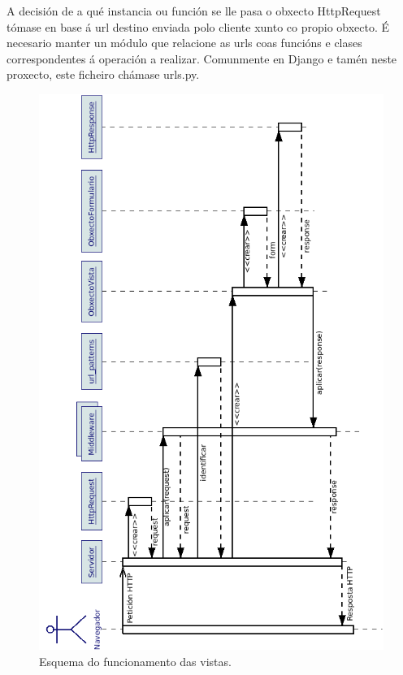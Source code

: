 A decisión de a qué instancia ou función se lle pasa o obxecto HttpRequest tómase en base á url destino enviada polo cliente xunto co propio obxecto. É necesario manter un módulo que relacione as urls coas funcións e clases correspondentes á operación a realizar. Comunmente en Django e tamén neste proxecto, este ficheiro chámase urls.py.

\begin{figure}[H]
	\centering
	\includegraphics[scale=0.6,keepaspectratio=true]{./images/secuencia_vista_v.png}
	\caption{Esquema do funcionamento das vistas.}
	\label{fig:vista}
\end{figure} 

